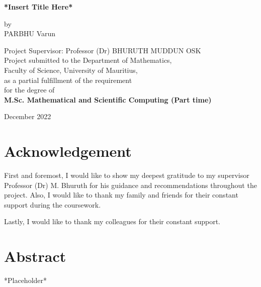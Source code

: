 \documentclass[a4paper,12pt,hidelinks]{report}
\begin{document}
\begin{titlepage}
\begin{center}
\begin{huge}
\textbf{*Insert Title Here*}\\
\end{huge}
\vspace{10mm}
\begin{huge}
by \\
PARBHU Varun \\ 
\end{huge}
\begin{large}
\vspace{15mm}
Project Supervisor: Professor (Dr) BHURUTH MUDDUN OSK \\
\vspace{15mm}
Project submitted to the Department of Mathematics,\\
Faculty of Science, University of Mauritius,\\
as a partial fulfillment of the requirement\\
for the degree of\\
\textbf{M.Sc. Mathematical and Scientific Computing (Part time)}\\
\end{large}
\vspace{30mm}
December 2022
\end{center}
\end{titlepage}
\tableofcontents


\listoffigures
{}

\listoftables
{}

\chapter*{Acknowledgement}
First and foremost, I would like to show my deepest gratitude to my supervisor Professor (Dr) M. Bhuruth for his guidance and recommendations throughout the project. Also, I would like to thank my family and friends for their constant support during the coursework.

\noindent Lastly, I would like to thank my colleagues for their constant support.
\chapter*{Abstract}
*Placeholder*
\end{document}
